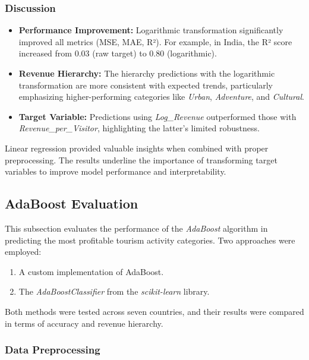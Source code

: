 \documentclass{article}
\begin{document}
\subsubsection{Discussion}
\begin{itemize}
    \item \textbf{Performance Improvement:} Logarithmic transformation significantly improved all metrics (MSE, MAE, R²). For example, in India, the R² score increased from 0.03 (raw target) to 0.80 (logarithmic).
    \item \textbf{Revenue Hierarchy:} The hierarchy predictions with the logarithmic transformation are more consistent with expected trends, particularly emphasizing higher-performing categories like \textit{Urban}, \textit{Adventure}, and \textit{Cultural}.
    \item \textbf{Target Variable:} Predictions using \textit{Log\_Revenue} outperformed those with \textit{Revenue\_per\_Visitor}, highlighting the latter’s limited robustness.
\end{itemize}

Linear regression provided valuable insights when combined with proper preprocessing. The results underline the importance of transforming target variables to improve model performance and interpretability.

\subsection{AdaBoost Evaluation}

This subsection evaluates the performance of the \textit{AdaBoost} algorithm in predicting the most profitable tourism activity categories. Two approaches were employed:
\begin{enumerate}
    \item A custom implementation of AdaBoost.
    \item The \textit{AdaBoostClassifier} from the \textit{scikit-learn} library.
\end{enumerate}
Both methods were tested across seven countries, and their results were compared in terms of accuracy and revenue hierarchy.

\subsubsection{Data Preprocessing}
\end{document}
